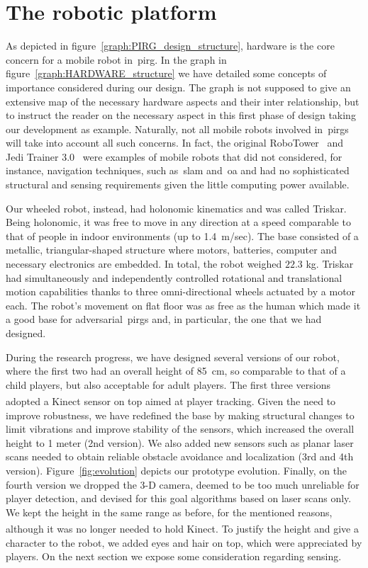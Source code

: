 \section{The robotic platform}\label{sec:roboplat} 
As depicted in figure~\ref{graph:PIRG_design_structure}, hardware is the core concern for a mobile robot in~\gls{pirg}. In the graph in figure~\ref{graph:HARDWARE_structure} we have detailed some concepts of importance considered during our design. The graph is not supposed to give an extensive map of the necessary hardware aspects and their inter relationship, but to instruct the reader on the necessary aspect in this first phase of design taking our development as example. Naturally, not all mobile robots involved in~\gls{pirg}s will take into account all such concerns. In fact, the original RoboTower~\citep{bonarini_timing_2014} and Jedi Trainer 3.0~\citep{martinoia_physically_2013} were examples of mobile robots that did not considered, for instance, navigation techniques, such as~\gls{slam} and~\gls{oa} and had no sophisticated structural and sensing requirements given the little computing power available.

Our wheeled robot, instead, had holonomic kinematics and was called Triskar. Being holonomic, it was free to move in any direction at a speed comparable to that of people in indoor environments (up to 1.4~m/sec). The base consisted of a metallic, triangular-shaped structure where motors, batteries, computer and necessary electronics are embedded. In total, the robot weighed $22.3$ kg. Triskar had simultaneously and independently controlled rotational and translational motion capabilities thanks to three omni-directional wheels actuated by a motor each. The robot's movement on flat floor was as free as the human which made it a good base for adversarial~\gls{pirg}s and, in particular, the one that we had designed. 



During the research progress, we have designed several versions of our robot, where the first two had an overall height of 85~cm, so comparable to that of a child players, but also acceptable for adult players. The first three versions adopted a Kinect\textsuperscript{\textregistered} sensor on top aimed at player tracking. Given the need to improve robustness, we have redefined the base by making structural changes to limit vibrations and improve stability of the sensors, which increased the overall height to 1 meter (2nd version). We also added new sensors such as planar laser scans needed to obtain reliable obstacle avoidance and localization (3rd and 4th version). Figure~\ref{fig:evolution} depicts our prototype evolution. Finally, on the fourth version we dropped the 3-D camera, deemed to be too much unreliable for player detection, and devised for this goal algorithms based on laser scans only. We kept the height in the same range as before, for the mentioned reasons, although it was no longer needed to hold Kinect\textsuperscript{\textregistered}. To justify the height and give a character to the robot, we added eyes and hair on top, which were appreciated by players. On the next section we expose some consideration regarding sensing.

